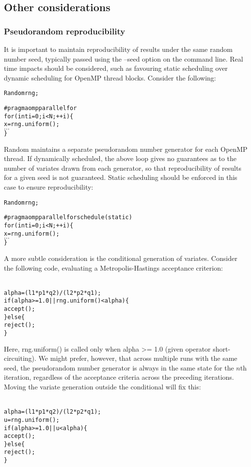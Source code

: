\subsection{Other considerations}

\subsubsection{Pseudorandom reproducibility\label{Pseudorandom_reproducibility}}

It is important to maintain reproducibility of results under the same random
number seed, typically passed using the
\textsf{--seed} option on the command line. Real time impacts should be
considered, such as favouring static scheduling over
dynamic scheduling for OpenMP thread
blocks. Consider the following:
\begin{alltt}{\sf
    Random rng;

    #pragma omp parallel for
    for (int i = 0; i < N; ++i) \{
       x = rng.uniform();
       \(\ldots\)
    \}
}\end{alltt}

\textsf{Random} maintains a separate pseudorandom number
generator for each OpenMP thread. If
dynamically scheduled, the above loop gives no guarantees as to the number of
variates drawn from each generator, so that reproducibility of results for a
given seed is not guaranteed. Static scheduling should be enforced in this
case to ensure reproducibility:
\begin{alltt}{\sf
    Random rng;

    #pragma omp parallel for schedule(static)
    for (int i = 0; i < N; ++i) \{
       x = rng.uniform();
       \(\ldots\)
    \}
}\end{alltt}

A more subtle consideration is the conditional generation of
variates. Consider the following code, evaluating a
Metropolis-Hastings acceptance criterion:
\begin{alltt}{\sf
    alpha = (l1*p1*q2)/(l2*p2*q1);
    if (alpha >= 1.0 || rng.uniform() < alpha) \{
      accept();
    \} else \{
      reject();
    \}
}\end{alltt}
Here, \textsf{rng.uniform()} is called only when \textsf{alpha >= 1.0} (given
operator short-circuiting). We might prefer, however, that across multiple
runs with the same seed, the pseudorandom number generator is always in the
same state for the $n$th iteration, regardless of the acceptance criteria
across the preceding iterations. Moving the variate generation outside the
conditional will fix this:
\begin{alltt}{\sf
    alpha = (l1*p1*q2)/(l2*p2*q1);
    u = rng.uniform();
    if (alpha >= 1.0 || u < alpha) \{
      accept();
    \} else \{
      reject();
    \}
}\end{alltt}
